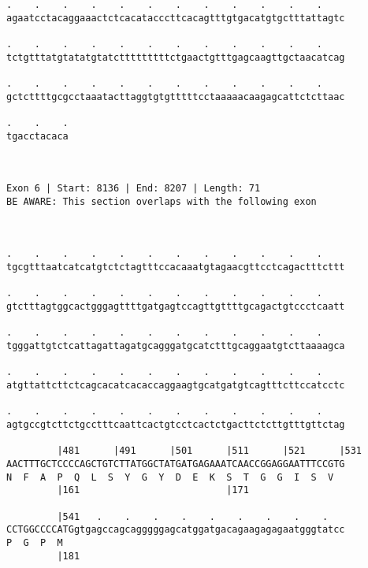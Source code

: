 \documentclass{article}
\begin{document}
\begin{Verbatim}
.    .    .    .    .    .    .    .    .    .    .    .    
agaatcctacaggaaactctcacatacccttcacagtttgtgacatgtgctttattagtc
                                                            
.    .    .    .    .    .    .    .    .    .    .    .    
tctgtttatgtatatgtatctttttttttctgaactgtttgagcaagttgctaacatcag
                                                            
.    .    .    .    .    .    .    .    .    .    .    .    
gctcttttgcgcctaaatacttaggtgtgtttttcctaaaaacaagagcattctcttaac
                                                            
.    .    .
tgacctacaca
           
           
 
Exon 6 | Start: 8136 | End: 8207 | Length: 71
BE AWARE: This section overlaps with the following exon



.    .    .    .    .    .    .    .    .    .    .    .    
tgcgtttaatcatcatgtctctagtttccacaaatgtagaacgttcctcagactttcttt
                                                            
.    .    .    .    .    .    .    .    .    .    .    .    
gtctttagtggcactgggagttttgatgagtccagttgttttgcagactgtccctcaatt
                                                            
.    .    .    .    .    .    .    .    .    .    .    .    
tgggattgtctcattagattagatgcagggatgcatctttgcaggaatgtcttaaaagca
                                                            
.    .    .    .    .    .    .    .    .    .    .    .    
atgttattcttctcagcacatcacaccaggaagtgcatgatgtcagtttcttccatcctc
                                                            
.    .    .    .    .    .    .    .    .    .    .    .    
agtgccgtcttctgcctttcaattcactgtcctcactctgacttctcttgtttgttctag
                                                            
         |481      |491      |501      |511      |521      |531
AACTTTGCTCCCCAGCTGTCTTATGGCTATGATGAGAAATCAACCGGAGGAATTTCCGTG
N  F  A  P  Q  L  S  Y  G  Y  D  E  K  S  T  G  G  I  S  V  
         |161                          |171                 
  
         |541   .    .    .    .    .    .    .    .    .   
CCTGGCCCCATGgtgagccagcagggggagcatggatgacagaagagagaatgggtatcc
P  G  P  M                                                  
         |181                                               
  

\end{Verbatim}
\end{document}
